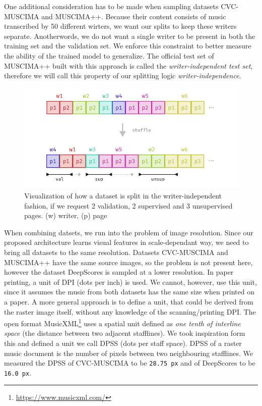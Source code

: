 One additional consideration has to be made when sampling datasets CVC-MUSCIMA and MUSCIMA++. Because their content consists of music transcribed by 50 different wirters, we want our splits to keep these writers separate. Anotherwords, we do not want a single writer to be present in both the training set and the validation set. We enforce this constraint to better measure the ability of the trained model to generalize. The official test set of MUSCIMA++ built with this approach is called the \emph{writer-independent test set}, therefore we will call this property of our splitting logic \emph{writer-independence}.

\begin{figure}[ht]
    \centering
    \includegraphics[width=140mm]{../img/dataset-splitting.pdf}
    \caption{Visualization of how a dataset is split in the writer-independent fashion, if we request 2 validation, 2 supervised and 3 unsupervised pages. (w) writer, (p) page}
    \label{fig:DatasetSplitting}
\end{figure}

When combining datsets, we run into the problem of image resolution. Since our proposed architecture learns visual features in scale-dependant way, we need to bring all datasets to the same resolution. Datasets CVC-MUSCIMA and MUSCIMA++ have the same source images, so the problem is not present here, however the dataset DeepScores is sampled at a lower resolution. In paper printing, a unit of DPI (dots per inch) is used. We cannot, however, use this unit, since it assumes the music from both datasets has the same size when printed on a paper. A more general approach is to define a unit, that could be derived from the raster image itself, without any knowledge of the scanning/printing DPI. The open format MusicXML\footnote{\url{https://www.musicxml.com/}} uses a spatial unit defined as \emph{one tenth of interline space} (the distance between two adjacent stafflines). We took inspiration form this and defined a unit we call DPSS (dots per staff space). DPSS of a raster music document is the number of pixels between two neighbouring stafflines. We measured the DPSS of CVC-MUSCIMA to be \verb`28.75 px` and of DeepScores to be \verb`16.0 px`.

